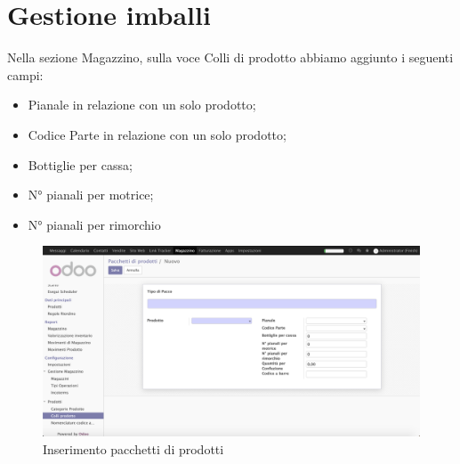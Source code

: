 \section{Gestione imballi}
Nella sezione Magazzino, sulla voce Colli di prodotto abbiamo aggiunto i seguenti campi:
\begin{itemize}
\item Pianale in relazione con un solo prodotto;
\item Codice Parte in relazione con un solo prodotto;
\item Bottiglie per cassa;
\item N° pianali per motrice;
\item N° pianali per rimorchio
\end{itemize}

\begin{figure}[H]
	\begin{center} \includegraphics[scale=0.3]{figures/product_packagin}
		\caption[Inserimento pacchetti di prodotti]{Inserimento pacchetti di prodotti}
		\label{fig:product_packagin}
	\end{center}
\end{figure}

